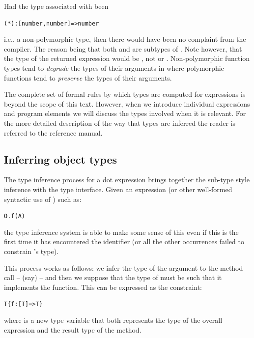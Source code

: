 Had the type associated with \q{*} been 
\begin{alltt}
(*):[number,number]=>number
\end{alltt}
i.e., a non-polymorphic type, then there would have been no complaint from the compiler. The reason being that both  and  are subtypes of . Note however, that the type of the returned expression would be , not  or . Non-polymorphic function types tend to \emph{degrade} the types of their arguments in where polymorphic functions tend to \emph{preserve} the types of their arguments. 

The complete set of formal rules by which types are computed for expressions is beyond the scope of this text. However, when we introduce individual expressions and program elements we will discuss the types involved when it is relevant. For the more detailed description of the way that types are inferred 
the reader is referred to the \go reference manual\cite{fgm:go:05}.

\subsection{Inferring object types}
\label{type:object}

The type inference process for a dot expression brings together the sub-type style inference with the type interface. Given an expression (or other well-formed syntactic use of ) such as:
\begin{alltt}
O.f(A)
\end{alltt}
the type inference system is able to make some sense of this even if this is the first time it has encountered the  identifier (or all the other occurrences failed to constrain 's type).

This process works as follows: we infer the type of the argument to the method call --  (say) -- and then we suppose that the type of  must be such that it implements the  function. This can be expressed as the constraint:
\begin{alltt}
T \typearrow \{ f:[T]=>T \}
\end{alltt}
where  is a new type variable that both represents the type of the overall expression and the result type of the  method.

